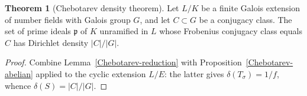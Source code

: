 \documentclass[10pt,a4paper]{article}
\newcommand{\uses}[1]{}
\theoremstyle{definition}
\newtheorem{theorem}{Theorem}[section]
\begin{document}
\begin{theorem}[Chebotarev density theorem]\label{Chebotarev-general}
Let $L/K$ be a finite Galois extension of number fields with Galois group $G$, and let
$C\subset G$ be a conjugacy class.  The set of prime ideals $\mathfrak{p}$ of $K$ unramified in
$L$ whose Frobenius conjugacy class equals $C$ has Dirichlet density $|C|/|G|$.
\end{theorem}

\begin{proof}\uses{Chebotarev-reduction, Chebotarev-abelian}
Combine Lemma~\ref{Chebotarev-reduction} with Proposition~\ref{Chebotarev-abelian} applied to
the cyclic extension $L/E$: the latter gives $\delta(T_\sigma) = 1/f$, whence
$\delta(S) = |C|/|G|$.
\end{proof}
\end{document}
